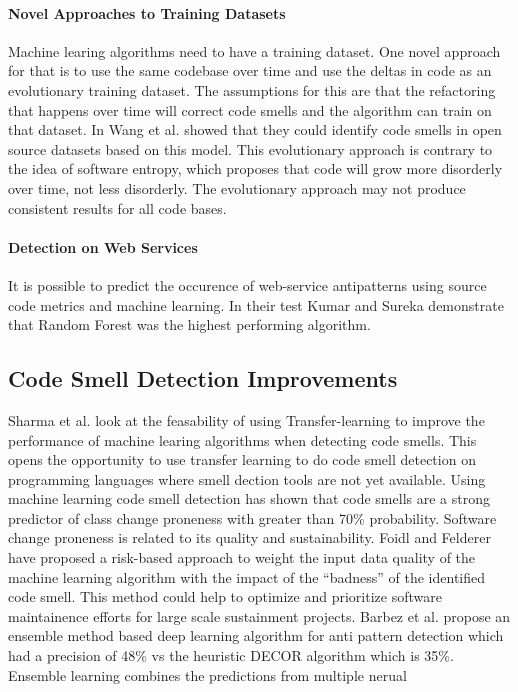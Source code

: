 \documentclass[conference]{IEEEtran}
\begin{document}
\paragraph{Novel Approaches to Training Datasets}
Machine learing algorithms need to have a training dataset. One novel approach for that is to use the same codebase over time and use the deltas in code as an evolutionary training dataset\cite{wang_using_2018}. The assumptions for this are that the refactoring that happens over time will correct code smells and the algorithm can train on that dataset. In\cite{wang_using_2018} Wang et al. showed that they could identify code smells in open source datasets based on this model.
This evolutionary approach is contrary to the idea of software entropy\cite{gupta_software_2018}, which proposes that code will grow more disorderly over time, not less disorderly. The evolutionary approach may not produce consistent results for all code bases.

\paragraph{Detection on Web Services}
It is possible to predict the occurence of web-service antipatterns using source code metrics and machine learning\cite{kumar_empirical_2018}. In their test Kumar and Sureka demonstrate that Random Forest was the highest performing algorithm.

\subsection{Code Smell Detection Improvements}
Sharma et al.\cite{sharma_feasibility_2019} look at the feasability of using Transfer-learning to improve the performance of machine learing algorithms when detecting code smells. This opens the opportunity to use transfer learning to do code smell detection on programming languages where smell dection tools are not yet available.
Using machine learning code smell detection has shown that code smells are a strong predictor of class change proneness\cite{pritam_assessment_2019} with greater than 70\% probability. Software change proneness is related to its quality and sustainability.
Foidl and Felderer have proposed\cite{foidl_risk-based_2019} a risk-based approach to weight the input data quality of the machine learning algorithm with the impact of the ``badness'' of the identified code smell. 
This method could help to optimize and prioritize software maintainence efforts for large scale sustainment projects.
Barbez et al. propose\cite{barbez_machine-learning_2019} an ensemble method based deep learning algorithm for anti pattern detection which had a precision of 48\% vs the heuristic DECOR algorithm which is 35\%. Ensemble learning combines the predictions from multiple nerual
\end{document}
